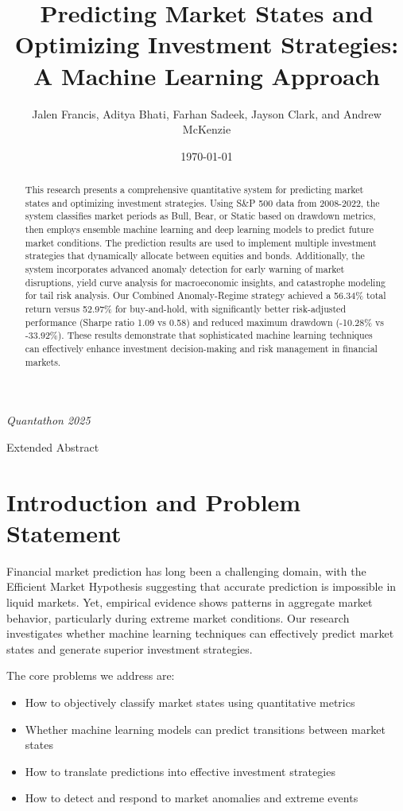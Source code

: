 \documentclass[10pt]{article}
\title{Predicting Market States and Optimizing Investment Strategies: \\
A Machine Learning Approach}
\author{Jalen Francis, Aditya Bhati, Farhan Sadeek, Jayson Clark, and Andrew McKenzie}
\date{\today}
\makeatletter
\renewcommand{\maketitle}{%
    \begin{center}
        \vspace*{0.5cm}
        \Large\@title
        
        \vspace{0.4cm}
        \large\@author
        
        \vspace{0.5cm}
        \normalsize\textit{Quantathon 2025}
        
        \vspace{0.3cm}
        \normalsize Extended Abstract
        \vspace{0.5cm}
    \end{center}
}
\makeatother
\begin{document}
\maketitle

\begin{abstract}
	This research presents a comprehensive quantitative system for predicting market states and optimizing investment strategies. Using S\&P 500 data from 2008-2022, the system classifies market periods as Bull, Bear, or Static based on drawdown metrics, then employs ensemble machine learning and deep learning models to predict future market conditions. The prediction results are used to implement multiple investment strategies that dynamically allocate between equities and bonds. Additionally, the system incorporates advanced anomaly detection for early warning of market disruptions, yield curve analysis for macroeconomic insights, and catastrophe modeling for tail risk analysis. Our Combined Anomaly-Regime strategy achieved a 56.34\% total return versus 52.97\% for buy-and-hold, with significantly better risk-adjusted performance (Sharpe ratio 1.09 vs 0.58) and reduced maximum drawdown (-10.28\% vs -33.92\%). These results demonstrate that sophisticated machine learning techniques can effectively enhance investment decision-making and risk management in financial markets.
\end{abstract}

\section{Introduction and Problem Statement}
Financial market prediction has long been a challenging domain, with the Efficient Market Hypothesis suggesting that accurate prediction is impossible in liquid markets. Yet, empirical evidence shows patterns in aggregate market behavior, particularly during extreme market conditions. Our research investigates whether machine learning techniques can effectively predict market states and generate superior investment strategies.

The core problems we address are:
\begin{itemize}
	\item How to objectively classify market states using quantitative metrics
	\item Whether machine learning models can predict transitions between market states
	\item How to translate predictions into effective investment strategies
	\item How to detect and respond to market anomalies and extreme events
\end{itemize}
\end{document}
